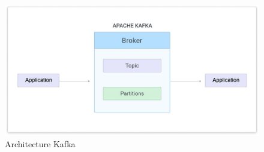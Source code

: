 \begin{figure}[H]
\centering
\includegraphics[width=\linewidth]{images/kafka.jpg}
\caption{Architecture Kafka}\label{fig:kafka}
\end{figure}
